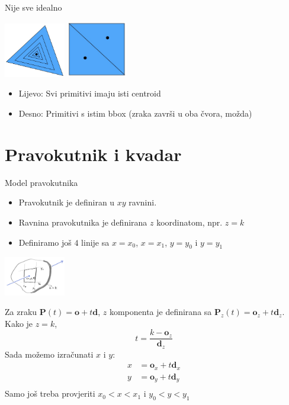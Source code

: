 \documentclass[9pt]{beamer}
\begin{document}
\begin{frame}{Nije sve idealno}
	\begin{center}
		\includegraphics[width=0.2\textwidth]{slike/slide_034_a.jpg}
		\qquad
		\includegraphics[width=0.2\textwidth]{slike/slide_034_b.jpg}
	\end{center}
\begin{itemize}
	\item Lijevo: Svi primitivi imaju isti centroid
	\item Desno: Primitivi s istim bbox (zraka završi u oba čvora, možda)
\end{itemize}
\end{frame}

\section{Pravokutnik i kvadar}
\begin{frame}{Model pravokutnika}
	\begin{itemize}
		\item Pravokutnik je definiran u $xy$ ravnini.
		\item Ravnina pravokutnika je definirana $z$ koordinatom, npr. $z=k$
		\item Definiramo još $4$ linije sa $x=x_0$, $x=x_1$, $y=y_0$ i $y=y_1$
	\end{itemize}
	\begin{center}
		\includegraphics[width=0.2\textwidth]{slike/fig.ray-rect.jpg}
	\end{center}

	Za zraku $\mathbf{P}(t) = \mathbf{o} + t\mathbf{d}$, $z$ komponenta je definirana sa $\mathbf{P}_z(t) = \mathbf{o}_z + t\mathbf{d}_z$. Kako je $z=k$,
	$$
	t = \frac{k-\mathbf{o}_z}{\mathbf{d}_z}
	$$
	Sada možemo izračunati $x$ i $y$:
	\begin{align*}
	x &= \mathbf{o}_x + t\mathbf{d}_x \\
	y &= \mathbf{o}_y + t\mathbf{d}_y \\
	\end{align*}
	Samo još treba provjeriti $x_0 < x < x_1$ i $y_0 < y < y_1$
\end{frame}
\end{document}
